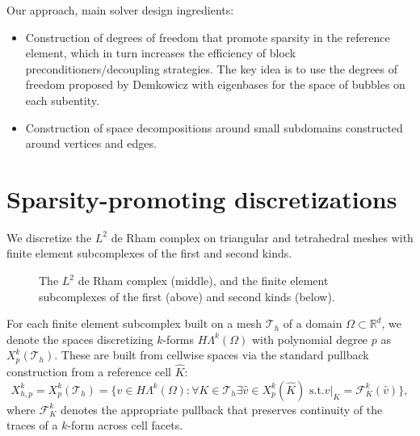 \documentclass[review,onefignum,onetabnum,a4paper]{siamart190516}
\let\grad\undefined
\let\curl\undefined
\let\div\undefined
\DeclareMathOperator{\grad}{grad}
\DeclareMathOperator{\curl}{curl}
\DeclareMathOperator{\div}{div}
\DeclareMathOperator{\Exists}{\exists}
\DeclareMathOperator{\Forall}{\forall}
\newcommand{\Hgrad}{H(\grad)}
\newcommand{\Hcurl}{H(\curl)}
\newcommand{\Hdiv}{H(\div)}
\newcommand{\Ltwo}{L^2}
\newcommand{\mesh}{\mathcal{T}_h}
\newcommand{\pullback}{\mathcal{F}}
\newcommand{\Khat}{\hat{K}}
\newcommand{\CG}{\mathrm{CG}}
\newcommand{\DG}{\mathrm{DG}}
\newcommand{\Ned}{\mathrm{Ned}^{1}}
\newcommand{\RT}{\mathrm{RT}}
\newcommand{\BDM}{\mathrm{BDM}}
\newcommand{\NedTwo}{\mathrm{Ned}^{2}}
\newcommand{\pef}[1]{\todo[inline,color=blue!40]{PEF: #1}}
\begin{document}
Our approach, main solver design ingredients:
\begin{itemize}
\item Construction of degrees of freedom that promote sparsity in the reference element, 
   which in turn increases the efficiency of block preconditioners/decoupling strategies. The key idea is
      to use the degrees of freedom proposed by Demkowicz with eigenbases for the space of bubbles on each subentity.
\item Construction of space decompositions around small subdomains constructed around vertices and edges.
\end{itemize}



\section{Sparsity-promoting discretizations} \label{sec:dofs}

We discretize the $\Ltwo$ de Rham complex on triangular and tetrahedral meshes with finite element subcomplexes of the first and second kinds.

\begin{figure}[htbp] 
\centering
{}
\caption{The $\Ltwo$ de Rham complex (middle), and the finite element subcomplexes of the first (above) and second kinds (below).}
\end{figure}
\pef{Fix vertical alignment}

For each finite element subcomplex built on a mesh $\mesh$ of a domain $\Omega \subset \mathbb{R}^d$, we denote the spaces discretizing $k$-forms $H\Lambda^k(\Omega)$ with polynomial degree $p$ as $X^k_p(\mesh)$.
These are built from cellwise spaces via the standard pullback construction from a reference cell $\Khat$:
\begin{equation}
X^k_{h,p} = X^k_p(\mesh) = \{ v \in H\Lambda^k(\Omega): \Forall K \in \mesh \Exists \hat{v} \in X^k_p(\Khat) \text{ s.t.} \left.v\right|_K = \pullback^k_K(\hat{v}) \},
\end{equation}
where $\pullback^k_K$ denotes the appropriate pullback that preserves continuity of the traces of a $k$-form across cell facets.
\end{document}

